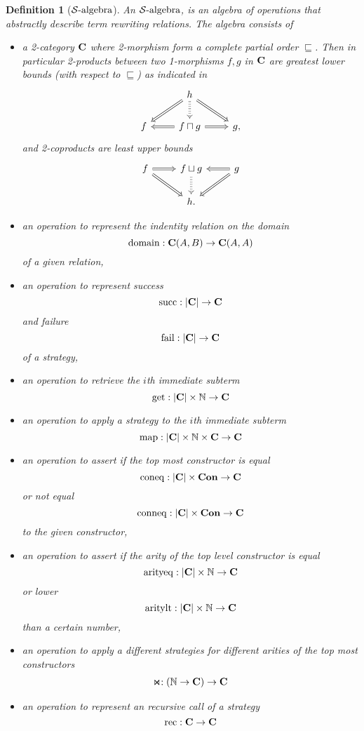 \documentclass{article}
\newtheorem{definition}[theorem]{Definition}
\newcommand{\Constructor}{\ensuremath \Cat{Con}}
\newcommand{\Disc}[1]{\ensuremath \left\vert #1 \right\vert}
\newcommand{\Cat}[1]{\ensuremath \mathbf{#1}}
\newcommand{\Nat}{\ensuremath \mathbb{N}}
\newcommand{\Hom}[1]{\ensuremath #1}
\newcommand{\SAlgebra}{\ensuremath \mathcal{S}\text{-algebra}}
\newcommand{\domain}{\ensuremath \operatorname{domain}}
\newcommand{\lfail}{\ensuremath \operatorname{fail}}
\newcommand{\lsucc}{\ensuremath \operatorname{succ}}
\newcommand{\get}{\ensuremath \operatorname{get}}
\newcommand{\map}{\ensuremath \operatorname{map}}
\newcommand{\arityeq}{\ensuremath \operatorname{arityeq}}
\newcommand{\aritylt}{\ensuremath \operatorname{aritylt}}
\newcommand{\coneq}{\ensuremath \operatorname{coneq}}
\newcommand{\conneq}{\ensuremath \operatorname{conneq}}
\newcommand{\witharity}{\ensuremath \Join}
\newcommand{\lfix}{\ensuremath \operatorname{rec}}
\begin{document}
\begin{definition}[$\SAlgebra$] \normalfont
  An $\SAlgebra$, is an algebra of operations that abstractly describe term rewriting relations. The algebra consists of
  \begin{itemize}
    \item a 2-category $\Cat{C}$ where 2-morphism form a complete partial order $\sqsubseteq$. Then in particular 2-products between two 1-morphisms $f,g$ in $\Cat{C}$ are greatest lower bounds (with respect to $\sqsubseteq$) as indicated in
    \[
       \begin{tikzcd}
           & h \ar[dl,Rightarrow] \ar[d,Rightarrow,dotted] \ar[dr,Rightarrow] &   \\
         f & f \sqcap g \ar[l,Rightarrow] \ar[r,Rightarrow] & g,
       \end{tikzcd}
    \]
    and 2-coproducts are least upper bounds
    \[
       \begin{tikzcd}
         f\ar[dr,Rightarrow] \ar[r,Rightarrow]  & f \sqcup g \ar[d,Rightarrow,dotted] & g \ar[dl,Rightarrow] \ar[l,Rightarrow] \\
         & h. &
       \end{tikzcd}
    \]
    \item an operation to represent the indentity relation on the domain \[\domain : \Hom{\Cat{C}}(A,B) \rightarrow \Hom{\Cat{C}}(A,A) \] of a given relation,
    \item an operation to represent success \[\lsucc : \Disc{\Cat{C}} \rightarrow \Cat{C} \] and failure \[\lfail : \Disc{\Cat{C}} \rightarrow \Cat{C} \] of a strategy,
    \item an operation to retrieve the $i$th immediate subterm \[\get : \Disc{\Cat{C}} \times \Nat \rightarrow \Cat{C} \]
    \item an operation to apply a strategy to the $i$th immediate subterm \[\map : \Disc{\Cat{C}} \times \Nat \times \Cat{C} \rightarrow \Cat{C} \]
    \item an operation to assert if the top most constructor is equal \[\coneq : \Disc{\Cat{C}} \times \Constructor \rightarrow \Cat{C} \] or not equal \[ \conneq : \Disc{\Cat{C}} \times \Constructor \rightarrow \Cat{C} \] to the given constructor,
    \item an operation to assert if the arity of the top level constructor is equal \[\arityeq : \Disc{\Cat{C}} \times \Nat \rightarrow \Cat{C} \] or lower \[\aritylt : \Disc{\Cat{C}} \times \Nat \rightarrow \Cat{C} \] than a certain number,
    \item an operation to apply a different strategies for different arities of the top most constructors
      \begin{align*}
        \witharity : (\Nat \rightarrow \Cat{C}) \rightarrow \Cat{C}
      \end{align*}
    \item an operation to represent an recursive call of a strategy \[\lfix : \Cat{C} \rightarrow \Cat{C}\]
  \end{itemize}


\end{definition}
\end{document}
